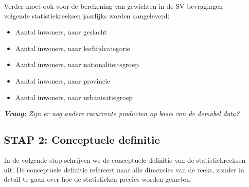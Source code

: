 \documentclass{SVnote}
\newcommand\vraag[1]{{\par\footnotesize\itshape\color{blue!50!black}\textbf{Vraag:} #1}}
\begin{document}
Verder moet ook voor de berekening van gewichten in de SV-bevragingen volgende statistiekreeksen jaarlijks worden aangeleverd:
\begin{itemize}
\item Aantal inwoners, naar geslacht
\item Aantal inwoners, naar leeftijdcategorie
\item Aantal inwoners, naar nationaliteitsgroep
\item Aantal inwoners, naar provincie
\item Aantal inwoners, naar urbanisatiegroep
\end{itemize}






\vraag{Zijn er nog andere recurrente producten op basis van de demobel data?}










\subsection{STAP 2: Conceptuele definitie}

In de volgende stap schrijven we de conceptuele definitie van de statistiekreeksen uit. De conceptuele definitie refereert naar alle dimensies van de reeks, zonder in detail te gaan over hoe de statistieken precies worden gemeten.
\end{document}
